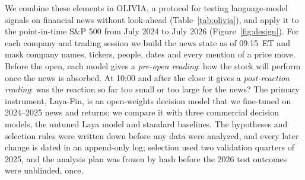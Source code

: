 We combine these elements in OLIVIA, a protocol for testing language-model signals on financial news without
look-ahead (Table~\ref{tab:olivia}), and apply it to the point-in-time S\&P 500 from July 2024 to July 2026
(Figure~\ref{fig:design}). For each company and trading session we build the news state as of 09:15~ET and mask
company names, tickers, people, dates and every mention of a price move. Before the open, each model gives a
\emph{pre-open reading}: how the stock will perform once the news is absorbed. At 10:00 and after the close it
gives a \emph{post-reaction reading}: was the reaction so far too small or too large for the news? The primary
instrument, Laya-Fin, is an open-weights decision model that we fine-tuned on 2024--2025 news and returns; we
compare it with three commercial decision models, the untuned Laya model and standard baselines. The hypotheses
and selection rules were written down before any data were analyzed, and every later change is dated in an
append-only log; selection used two validation quarters of 2025, and the analysis plan was frozen by hash before
the 2026 test outcomes were unblinded, once.

